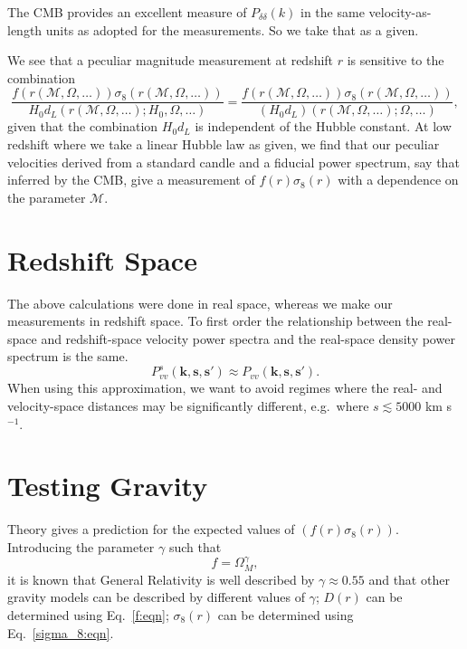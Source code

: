 \documentclass[11pt, oneside]{article}   	%
\begin{document}
The CMB provides an excellent measure of $P_{\delta \delta}(k)$ in the same velocity-as-length units as adopted
for the measurements.  So we take that as a given.

We see that a
peculiar magnitude measurement at redshift $r$ is sensitive to the combination
\begin{equation}
\frac{f(r(\mathcal{M}, \Omega,\ldots)) \sigma_8(r(\mathcal{M}, \Omega,\ldots))}{H_0 d_L(r(\mathcal{M}, \Omega,\ldots); H_0, \Omega,\ldots)}=
\frac{f(r(\mathcal{M}, \Omega,\ldots)) \sigma_8(r(\mathcal{M}, \Omega,\ldots))}{(H_0 d_L)(r(\mathcal{M}, \Omega,\ldots); \Omega,\ldots)},
\end{equation}
given that the combination $H_0 d_L$ is independent of the Hubble constant.
At low redshift where we take a linear Hubble law as given, we find that our peculiar velocities derived from a standard candle and
a fiducial power spectrum, say that inferred by the CMB,
give a measurement of $f(r)\sigma_8(r)$ with a dependence on the parameter $\mathcal{M}$.
 
\section{Redshift Space}
The above calculations were done in real space, whereas we make our measurements in redshift space.  To first order
the relationship between the real-space and redshift-space velocity
power spectra and the real-space density power spectrum is the same.
\begin{equation}
P^s_{vv}(\mathbf{k}, \mathbf{s}, \mathbf{s'}) \approx P_{vv}(\mathbf{k}, \mathbf{s}, \mathbf{s'}) .
\end{equation}
When using this approximation, we want to avoid regimes where the real- and velocity-space distances may be significantly different,
e.g.\ where $s \lesssim 5000$ km s$^{-1}$.

\section{Testing Gravity}
Theory gives a prediction for the expected values of $(f(r) \sigma_8(r))$.
Introducing the parameter $\gamma$ such that
\begin{equation}
f= \Omega_M^\gamma,
\end{equation}
it is known that General Relativity is well described by $\gamma \approx 0.55$ and that other gravity models can 
be described by different values of $\gamma$;  $D(r)$ can  be determined using Eq.~\ref{f:eqn};
$\sigma_8(r)$ can be determined using Eq.~\ref{sigma_8:eqn}.
\end{document}

